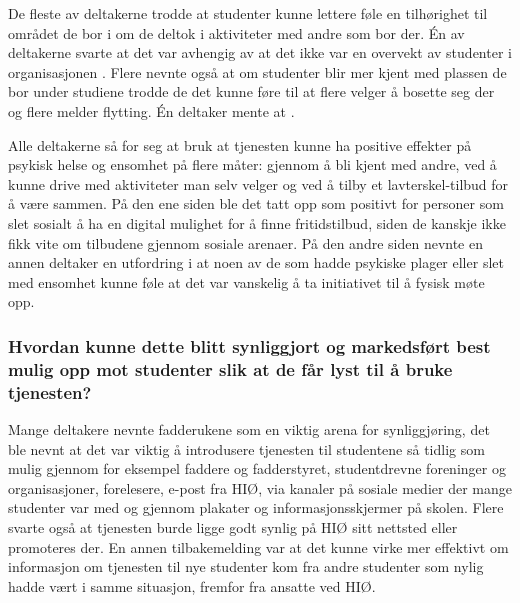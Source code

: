 De fleste av deltakerne trodde at studenter kunne lettere føle en tilhørighet til området de bor i om de deltok i aktiviteter med andre som bor der. Én av deltakerne svarte at det var avhengig av at det ikke var en overvekt av studenter i organisasjonen . Flere nevnte også at om studenter blir mer kjent med plassen de bor under studiene trodde de det kunne føre til at flere velger å bosette seg der og flere melder flytting. Én deltaker mente at .

Alle deltakerne så for seg at bruk at tjenesten kunne ha positive effekter på psykisk helse og ensomhet på flere måter: gjennom å bli kjent med andre, ved å kunne drive med aktiviteter man selv velger og ved å tilby et lavterskel-tilbud for å være sammen. På den ene siden ble det tatt opp som positivt for personer som slet sosialt å ha en digital mulighet for å finne fritidstilbud, siden de kanskje ikke fikk vite om tilbudene gjennom sosiale arenaer. På den andre siden nevnte en annen deltaker en utfordring i at noen av de som hadde psykiske plager eller slet med ensomhet kunne føle at det var vanskelig å ta initiativet til å fysisk møte opp.

\setlength{\leftskip}{0pt}
\subsubsection{Hvordan kunne dette blitt synliggjort og markedsført best mulig opp mot studenter slik at de får lyst til å bruke tjenesten?}
Mange deltakere nevnte fadderukene som en viktig arena for synliggjøring, det ble nevnt at det var viktig å introdusere tjenesten til studentene så tidlig som mulig gjennom for eksempel faddere og fadderstyret, studentdrevne foreninger og organisasjoner, forelesere, e-post fra HIØ, via kanaler på sosiale medier der mange studenter var med og gjennom plakater og informasjonsskjermer på skolen. Flere svarte også at tjenesten burde ligge godt synlig på HIØ sitt nettsted eller promoteres der. En annen tilbakemelding var at det kunne virke mer effektivt om informasjon om tjenesten til nye studenter kom fra andre studenter som nylig hadde vært i samme situasjon, fremfor fra ansatte ved HIØ.

